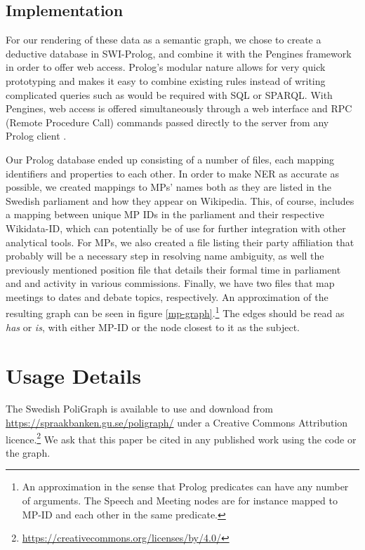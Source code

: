 \subsection{Implementation}

For our rendering of these data as a semantic graph, we chose to create a deductive database in SWI-Prolog, and combine it with the Pengines framework in order to offer web access. Prolog's modular nature allows for very quick prototyping and makes it easy to combine existing rules instead of writing complicated queries such as would be required with SQL or SPARQL. With Pengines, web access is offered simultaneously through a web interface and RPC (Remote Procedure Call) commands passed directly to the server from any Prolog client \cite{lager_pengines_2014}.



Our Prolog database ended up consisting of a number of files, each mapping identifiers and properties to each other. In order to make NER as accurate as possible, we created mappings to MPs' names both as they are listed in the Swedish parliament and how they appear on Wikipedia. This, of course, includes a mapping between unique MP IDs in the parliament and their respective Wikidata-ID, which can potentially be of use for further integration with other analytical tools. For MPs, we also created a file listing their party affiliation that probably will be a necessary step in resolving name ambiguity, as well the previously mentioned position file that details their formal time in parliament and and activity in various commissions. Finally, we have two files that map meetings to dates and debate topics, respectively. An approximation of the resulting graph can be seen in figure \ref{mp-graph}.\footnote{An approximation in the sense that Prolog predicates can have any number of arguments. The Speech and Meeting nodes are for instance mapped to MP-ID and each other in the same predicate.} The edges should be read as \emph{has} or \emph{is}, with either MP-ID or the node closest to it as the subject.

\section{Usage Details}

The Swedish PoliGraph is available to use and download from \url{https://spraakbanken.gu.se/poligraph/} under a Creative Commons Attribution licence.\footnote{\url{https://creativecommons.org/licenses/by/4.0/}} We ask that this paper be cited in any published work using the code or the graph.

